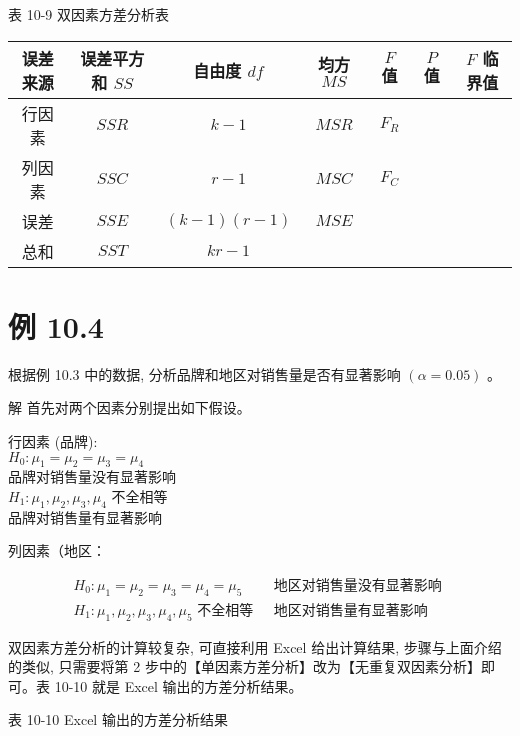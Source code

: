 \documentclass[10pt]{article}
\begin{document}
\begin{CJK*}{UTF8}{bsmi}
表 10-9 双因素方差分析表

\begin{center}
\begin{tabular}{ccccccc}
\hline
误差来源 & 误差平方和 $S S$ & 自由度 $d f$ & 均方 $M S$ & $F$ 值 & $P$ 值 & $F$ 临界值 \\
\hline
行因素 & $S S R$ & $k-1$ & $M S R$ & $F_{R}$ &  &  \\
列因素 & $S S C$ & $r-1$ & $M S C$ & $F_{C}$ &  &  \\
误差 & $S S E$ & $(k-1)(r-1)$ & $M S E$ &  &  &  \\
总和 & $S S T$ & $k r-1$ &  &  &  &  \\
\hline
\end{tabular}
\end{center}

\section*{例 10.4}
根据例 10.3 中的数据, 分析品牌和地区对销售量是否有显著影响 $(\alpha=0.05)$ 。

解 首先对两个因素分别提出如下假设。

行因素 (品牌):\\
$H_{0}: \mu_{1}=\mu_{2}=\mu_{3}=\mu_{4}$\\
品牌对销售量没有显著影响\\
$H_{1}: \mu_{1}, \mu_{2}, \mu_{3}, \mu_{4}$ 不全相等\\
品牌对销售量有显著影响

列因素（地区：

$$
\begin{array}{ll}
H_{0}: \mu_{1}=\mu_{2}=\mu_{3}=\mu_{4}=\mu_{5} & \text { 地区对销售量没有显著影响 } \\
H_{1}: \mu_{1}, \mu_{2}, \mu_{3}, \mu_{4}, \mu_{5} \text { 不全相等 } & \text { 地区对销售量有显著影响 }
\end{array}
$$

双因素方差分析的计算较复杂, 可直接利用 Excel 给出计算结果, 步骤与上面介绍的类似, 只需要将第 2 步中的【单因素方差分析】改为【无重复双因素分析】即可。表 10-10 就是 Excel 输出的方差分析结果。

表 10-10 Excel 输出的方差分析结果


\end{CJK*}
\end{document}
